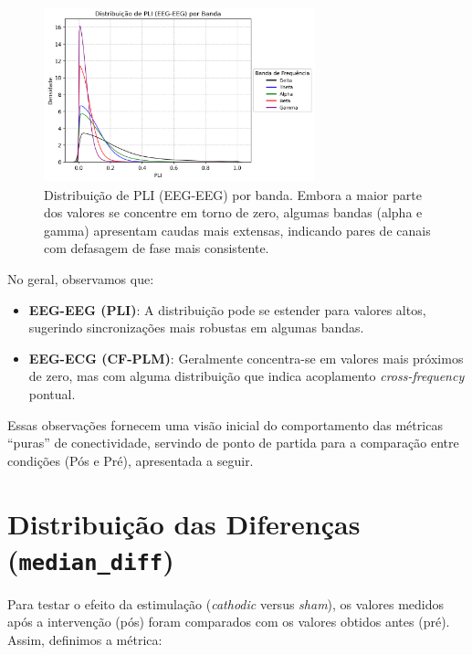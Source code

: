 \begin{figure}[htb]
    \centering
    \includegraphics[width=0.7\textwidth]{figs/3_1_connectivity_metrics/Distribuição_de_PLI_(EEG-EEG)_por_Banda.png}
    \caption{Distribuição de PLI (EEG-EEG) por banda. Embora a maior parte dos valores se concentre em torno de zero, algumas bandas (alpha e gamma) apresentam caudas mais extensas, indicando pares de canais com defasagem de fase mais consistente.}
    \label{fig:pli_eeg_eeg}
\end{figure}

No geral, observamos que:

\begin{itemize}
    \item \textbf{EEG-EEG (PLI)}: A distribuição pode se estender para valores altos, sugerindo sincronizações mais robustas em algumas bandas.
    \item \textbf{EEG-ECG (CF-PLM)}: Geralmente concentra-se em valores mais próximos de zero, mas com alguma distribuição que indica acoplamento \emph{cross-frequency} pontual.
\end{itemize}

Essas observações fornecem uma visão inicial do comportamento das métricas “puras” de conectividade, servindo de ponto de partida para a comparação entre condições (Pós e Pré), apresentada a seguir.

\section{Distribuição das Diferenças (\texttt{median\_diff})}

Para testar o efeito da estimulação (\emph{cathodic} versus \emph{sham}), os valores medidos após a intervenção (pós) foram comparados com os valores obtidos antes (pré). Assim, definimos a métrica:


